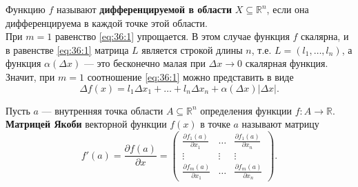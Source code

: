 \documentclass[12pt]{report}
\numberwithin{equation}{section}
\begin{document}
Функцию $f$ называют \textbf{дифференцируемой в области} $X \subseteq \mathbb{R}^n$, если она дифференцируема в каждой точке этой области.\\

При $m = 1$ равенство \eqref{eq:36:1} упрощается. В этом случае функция $f$ скалярна, и в равенстве \eqref{eq:36:1} матрица $L$ является строкой длины $n$, т.е. $L = (l_1, \ldots, l_n)$, а функция $\alpha(\Delta x)$ --- это бесконечно малая при $\Delta x \to 0$ скалярная функция. Значит, при $m = 1$ соотношение \eqref{eq:36:1} можно представить в виде
\begin{equation} \label{eq:36:2}
\Delta f(x) = l_1 \Delta x_1 + \dots + l_n \Delta x_n + \alpha(\Delta x) |\Delta x|.
\end{equation}

Пусть $a$ --- внутренняя точка области $A \subseteq \mathbb{R}^n$ определения функции $f : A \to \mathbb{R}$. \textbf{Матрицей Якоби} векторной функции $f(x)$ в точке $a$ называют матрицу
\begin{equation} \label{eq:36:3}
f'(a) = \frac{\partial f(a)}{\partial x} = 
\begin{pmatrix}
\frac{\partial f_1(a)}{\partial x_1} & \dots & \frac{\partial f_1(a)}{\partial x_n}\\
\vdots & \vdots & \vdots\\
\frac{\partial f_m(a)}{\partial x_1} & \dots & \frac{\partial f_m(a)}{\partial x_n}
\end{pmatrix}.\end{equation}
\end{document}

